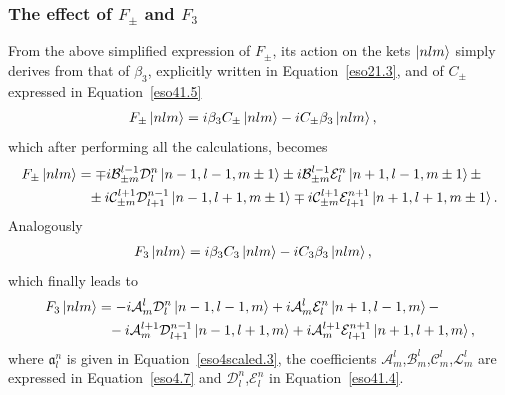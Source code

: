 \documentclass[12pt,a4paper]{report}
\theoremstyle{definition}
\theoremstyle{remark}
\theoremstyle{remark}
\begin{document}
\subsubsection{The effect of $F_\pm$ and $F_3$}
From the above simplified expression of $F_\pm$, its action on the kets $\ket{nlm}$ simply derives from that of $\beta_3$, explicitly written in Equation~\ref{eso21.3}, and of $C_\pm$ expressed in Equation~\ref{eso41.5}
\begin{align*}
F_\pm\ket{nlm}&=i\beta_3C_\pm\ket{nlm}-iC_\pm\beta_3\ket{nlm},
\end{align*}
which after performing all the calculations, becomes
\begin{align*}
F_\pm\ket{nlm}&=\mp i\mathcal{B}_{\pm m}^{l-1}\mathcal{D}_l^n\ket{n-1,l-1,m\pm 1}\pm i\mathcal{B}_{\pm m}^{l-1}\mathcal{E}_l^n\ket{n+1,l-1,m\pm 1}\pm\\
&\phantom{=}\pm i\mathcal{C}_{\pm m}^{l+1}\mathcal{D}_{l+1}^{n-1}\ket{n-1,l+1,m\pm 1}\mp i\mathcal{C}_{\pm m}^{l+1}\mathcal{E}_{l+1}^{n+1}\ket{n+1,l+1,m\pm 1}.
\end{align*}
Analogously
\begin{align*}
F_3\ket{nlm}&=i\beta_3C_3\ket{nlm}-iC_3\beta_3\ket{nlm},
\end{align*}
which finally leads to
\begin{align*}
F_3\ket{nlm}&=-i\mathcal{A}_{m}^{l}\mathcal{D}_l^n\ket{n-1,l-1,m}+i\mathcal{A}_{m}^{l}\mathcal{E}_l^n\ket{n+1,l-1,m}-\\
&\phantom{=}-i\mathcal{A}_{m}^{l+1}\mathcal{D}_{l+1}^{n-1}\ket{n-1,l+1,m}+i\mathcal{A}_{m}^{l+1}\mathcal{E}_{l+1}^{n+1}\ket{n+1,l+1,m},
\end{align*}
where $\mathfrak{a}_l^n$ is given in Equation~\ref{eso4scaled.3}, the coefficients $\mathcal{A}_m^l$,$\mathcal{B}_m^l$,$\mathcal{C}_m^l$,$\mathcal{L}_m^l$ are expressed in Equation~\ref{eso4.7} and $\mathcal{D}_l^n$,$\mathcal{E}_l^n$ in Equation~\ref{eso41.4}.
\end{document}
